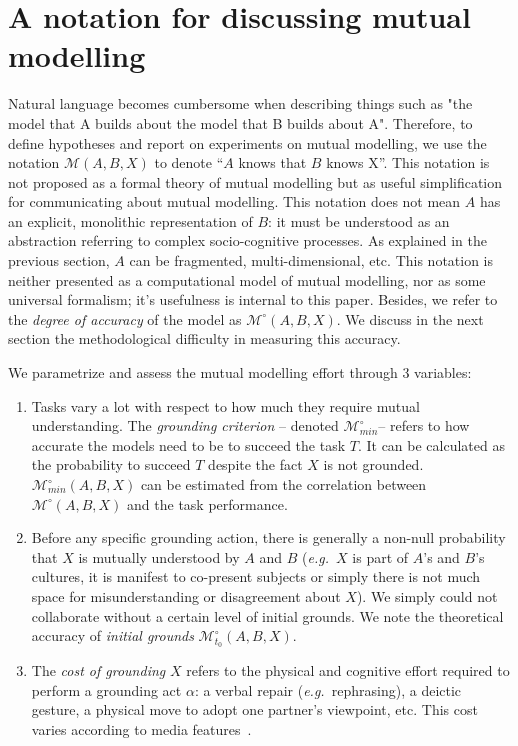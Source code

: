 \documentclass[natbib]{svjour3}
\newcommand{\eg}{{\textit{e.g.\ }}}
\newcommand{\model}[3]{{$\mathcal{M}(#1, #2, #3)$}}
\newcommand{\Model}[3]{{$\mathcal{M}^{\circ}(#1, #2, #3)$}}
\newcommand{\groundingcriterion}{{$\mathcal{M}^{\circ}_{min}$}}
\begin{document}
\section{A notation for discussing mutual modelling }

Natural language becomes cumbersome when describing things such as "the model that A builds about the model that B builds about A". Therefore, to define hypotheses and report on experiments on mutual modelling, we use  the notation
\model{A}{B}{X} to denote ``$A$ knows that $B$ knows X''. This  notation is not proposed as a formal theory of mutual modelling but as useful simplification for communicating about mutual modelling. This notation does not mean $A$
has an explicit, monolithic representation of $B$: it must be understood as an
abstraction referring to complex socio-cognitive processes.  As explained in the previous section, $A$ can be fragmented, multi-dimensional, etc. This notation is neither presented as a computational model of mutual modelling, nor as some universal formalism; it's usefulness is internal to this paper.  Besides, we refer to
the \emph{degree of accuracy} of the model as \Model{A}{B}{X}. We discuss in the next section the methodological difficulty in measuring this accuracy.

We parametrize and assess the mutual modelling effort through 3 variables:

\begin{enumerate}

    \item Tasks vary a lot with respect to how much they require mutual
        understanding.  The \emph{grounding criterion} -- denoted
        \groundingcriterion -- refers to how accurate the models need to be to
        succeed the task $T$. It can be calculated as the probability to succeed
        $T$ despite the fact $X$ is not grounded.
        $\mathcal{M}^{\circ}_{min}(A,B,X)$ can be estimated from the correlation
        between \Model{A}{B}{X} and the task performance. 

    \item Before any specific grounding action, there is generally a non-null
        probability that $X$ is mutually understood by $A$ and $B$ (\eg $X$ is
        part of $A$'s and $B$'s cultures, it is manifest to co-present subjects
        or simply there is not much space for misunderstanding or disagreement
        about $X$). We simply could not collaborate without a certain level of
        initial grounds. We note the theoretical accuracy of \emph{initial
        grounds} $\mathcal{M}^{\circ}_{t_0}(A,B,X)$.

    \item The \emph{cost of grounding} $X$ refers to the physical and cognitive
        effort required to perform a grounding act $\alpha$: a verbal repair
        (\eg rephrasing), a deictic gesture, a physical move to adopt one
        partner's viewpoint, etc. This cost varies according to media
        features~\citep{clark1991grounding}.

\end{enumerate}
\end{document}
